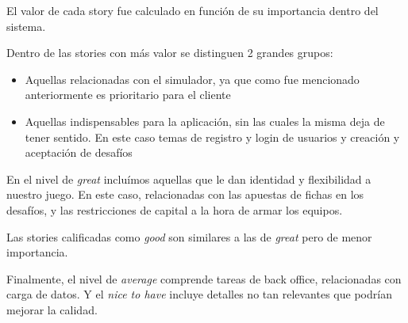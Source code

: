 El valor de cada story fue calculado en función de su importancia dentro del sistema. 

Dentro de las stories con más valor se distinguen 2 grandes grupos:
\begin{itemize}
  \item Aquellas relacionadas con el simulador, ya que como fue mencionado anteriormente es prioritario para el cliente
  \item Aquellas indispensables para la aplicación, sin las cuales la misma deja de tener sentido. En este caso temas de registro y login de usuarios y creación y aceptación
  de desafíos
\end{itemize}

En el nivel de \emph{great} incluímos aquellas que le dan identidad y flexibilidad a nuestro juego. En este caso, relacionadas con las apuestas de fichas en los desafíos,
y las restricciones de capital a la hora de armar los equipos.

Las stories calificadas como \emph{good} son similares a las de \emph{great} pero de menor importancia.

Finalmente, el nivel de \emph{average} comprende tareas de back office, relacionadas con carga de datos. Y el \emph{nice to have} incluye detalles no tan relevantes que podrían mejorar la calidad.

